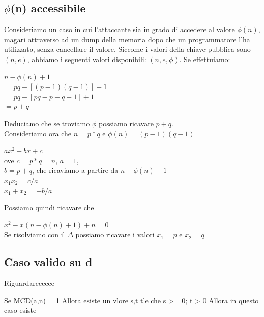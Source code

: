 \documentclass[11pt, oneside]{article}   	%
\begin{document}
\subsection*{$\phi$(n) accessibile}
Consideriamo un caso in cui l'attaccante sia in grado di accedere al valore $\phi(n)$, magari attraverso ad un dump della memoria dopo che un programmatore l'ha utilizzato, senza cancellare il valore. Siccome i valori della chiave pubblica sono $(n, e)$, abbiamo i seguenti valori disponibili: $(n, e, \phi)$. Se effettuiamo:
\begin{center}
$n-\phi(n)+1 =$\\
$=pq-[(p-1)(q-1)]+1=$\\
$=pq-[pq-p-q+1]+1=$\\
$=p+q$
\end{center}
Deduciamo che se troviamo $\phi$ possiamo ricavare $p+q$. \\Consideriamo ora che $n=p*q$ e $\phi(n) = (p-1)(q-1)$
\begin{center}
$ax^2+bx+c$ \\ove $c = p*q = n$, $a =1$, \\$b = p+q$, che ricaviamo a partire da $n-\phi(n)+1$\\
$x_1x_2 = c/a$\\
$x_1+x_2 = -b/a$
\end{center}
Possiamo quindi ricavare che\begin{center}
$x^2-x(n-\phi(n)+1)+n=0$\\
Se risolviamo con il $\Delta$ possiamo ricavare i valori $x_1 = p $ e $x_2 = q$
\end{center}
\subsection*{Caso valido su d}
Riguardareeeeee
\begin{center}
Se MCD(a,n) = 1
Allora esiste un vlore s,t tle che s >= 0; t > 0
Allora in questo caso esiste 
\end{center}
\end{document}
